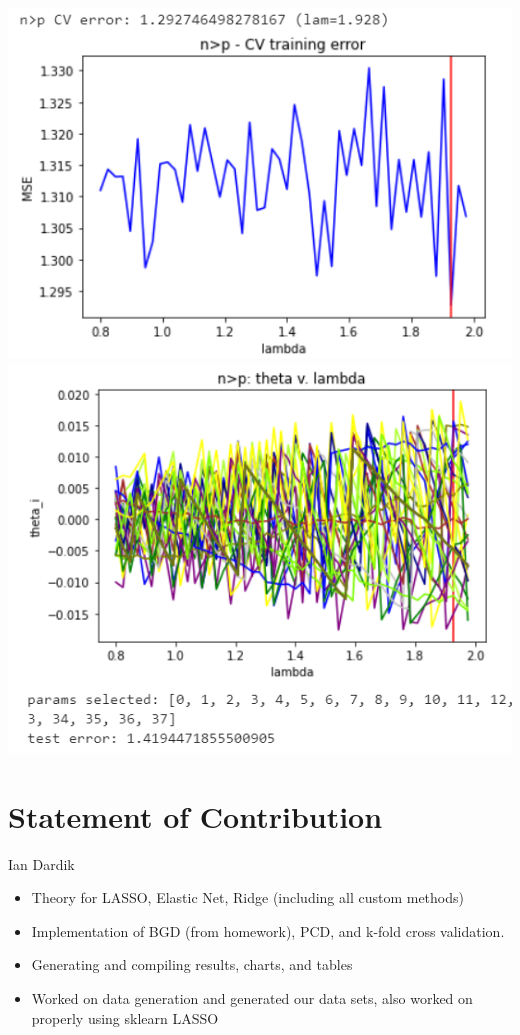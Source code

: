 \documentclass[11pt]{article}
\begin{document}
\begin{center}
\includegraphics[scale=0.7]{charts/bgd_corr_n_gt_p_err.PNG}
\includegraphics[scale=0.7]{charts/bgd_corr_n_gt_p_thetas.PNG}
\end{center}

\section{Statement of Contribution}
Ian Dardik
\begin{itemize}
	\item Theory for LASSO, Elastic Net, Ridge (including all custom methods)
	\item Implementation of BGD (from homework), PCD, and k-fold cross validation.  
	\item Generating and compiling results, charts, and tables
	\item Worked on data generation and generated our data sets, also worked on properly using sklearn LASSO
\end{itemize}
\end{document}
